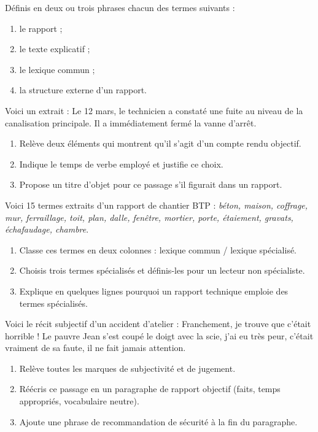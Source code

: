 \documentclass[11pt]{article}
\newcounter{popsec}
\newcounter{popsub}
\newcommand{\courssub}[1]{%
  \stepcounter{popsub}%
  \par\vspace{9pt}\noindent{\popxbold\fontsize{11.5}{13}\selectfont\color{popink}{\color{poporange}\thepopsec.\thepopsub}\hspace{6pt}#1}\par\nopagebreak\vspace{4pt}
}
\begin{document}
\begin{exercice}[Définitions]
Définis en deux ou trois phrases chacun des termes suivants :
\begin{enumerate}
\item le rapport ;
\item le texte explicatif ;
\item le lexique commun ;
\item la structure externe d'un rapport.
\end{enumerate}
\end{exercice}

\begin{exercice}
Voici un extrait : \og Le 12 mars, le technicien a constaté une fuite au niveau de la canalisation principale. Il a immédiatement fermé la vanne d'arrêt. \fg
\begin{enumerate}
\item Relève deux éléments qui montrent qu'il s'agit d'un compte rendu objectif.
\item Indique le temps de verbe employé et justifie ce choix.
\item Propose un titre d'objet pour ce passage s'il figurait dans un rapport.
\end{enumerate}
\end{exercice}

\courssub{Je m'entraîne}

\begin{exercice}
Voici 15 termes extraits d'un rapport de chantier BTP : \emph{béton, maison, coffrage, mur, ferraillage, toit, plan, dalle, fenêtre, mortier, porte, étaiement, gravats, échafaudage, chambre}.
\begin{enumerate}
\item Classe ces termes en deux colonnes : lexique commun / lexique spécialisé.
\item Choisis trois termes spécialisés et définis-les pour un lecteur non spécialiste.
\item Explique en quelques lignes pourquoi un rapport technique emploie des termes spécialisés.
\end{enumerate}
\end{exercice}

\begin{exercice}
Voici le récit subjectif d'un accident d'atelier : \og Franchement, je trouve que c'était horrible ! Le pauvre Jean s'est coupé le doigt avec la scie, j'ai eu très peur, c'était vraiment de sa faute, il ne fait jamais attention. \fg
\begin{enumerate}
\item Relève toutes les marques de subjectivité et de jugement.
\item Réécris ce passage en un paragraphe de rapport objectif (faits, temps appropriés, vocabulaire neutre).
\item Ajoute une phrase de recommandation de sécurité à la fin du paragraphe.
\end{enumerate}
\end{exercice}
\end{document}
